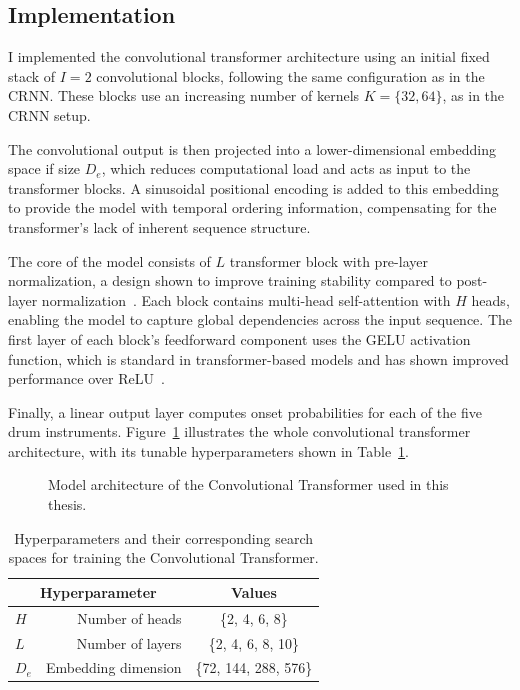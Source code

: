 \subsection{Implementation}

I implemented the convolutional transformer architecture using an initial fixed stack of $I = 2$ convolutional blocks, following the same configuration as in the \gls{CRNN}. These blocks use an increasing number of kernels $K = \{32, 64\}$, as in the \gls{CRNN} setup. 

The convolutional output is then projected into a lower-dimensional embedding space if size $D_e$, which reduces computational load and acts as input to the transformer blocks. A sinusoidal positional encoding is added to this embedding to provide the model with temporal ordering information, compensating for the transformer's lack of inherent sequence structure. 

The core of the model consists of $L$ transformer block with pre-layer normalization, a design shown to improve training stability compared to post-layer normalization~\cite{pmlr-v119-xiong20b}. Each block contains multi-head self-attention with $H$ heads, enabling the model to capture global dependencies across the input sequence. The first layer of each block's feedforward component uses the \gls{GELU} activation function, which is standard in transformer-based models and has shown improved performance over \gls{ReLU}~\cite{devlin-etal-2019-bert, hendrycks2023gaussianerrorlinearunits}. 

Finally, a linear output layer computes onset probabilities for each of the five drum instruments. Figure~\ref{CTFigure} illustrates the whole convolutional transformer architecture, with its tunable hyperparameters shown in Table~\ref{CTHyperparams}.

\begin{figure}[H]
    \centering
    
    \caption{Model architecture of the Convolutional Transformer used in this thesis.}
    \label{CTFigure}
\end{figure}

\begin{table}[H]
    \centering
    \begin{tabular}{lr|c}
        \multicolumn{2}{c|}{Hyperparameter} & Values       \\
        \hline
        $H$ & Number of heads     & \{2, 4, 6, 8\} \\
        $L$ & Number of layers      & \{2, 4, 6, 8, 10\} \\
        $D_e$ & Embedding dimension      & \{72, 144, 288, 576\} \\
    \end{tabular}
    \caption{Hyperparameters and their corresponding search spaces for training the Convolutional Transformer.}
    \label{CTHyperparams}
\end{table}

